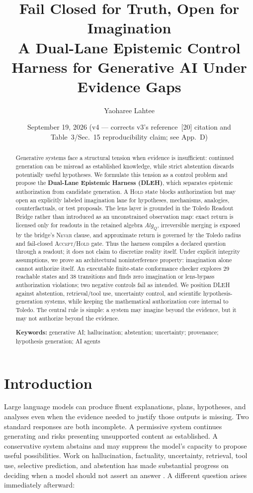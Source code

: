 \documentclass[10pt,twocolumn]{article}
\title{\Large\bfseries Fail Closed for Truth, Open for Imagination\\[2pt]
\large A Dual-Lane Epistemic Control Harness for Generative AI Under Evidence Gaps}
\author{Yaoharee Lahtee}
\affil{Open Civil Science Initiative}
\date{September 19, 2026 \; (v4 --- corrects v3's reference~[20] citation and Table~3/Sec.~15 reproducibility claim; see App.~D)}
\begin{document}
\maketitle

\begin{abstract}
\noindent
Generative systems face a structural tension when evidence is insufficient: continued generation can be misread as established knowledge, while strict abstention discards potentially useful hypotheses. We formulate this tension as a control problem and propose the \textbf{Dual-Lane Epistemic Harness (DLEH)}, which separates epistemic authorization from candidate generation. A \textsc{Hold} state blocks authorization but may open an explicitly labeled imagination lane for hypotheses, mechanisms, analogies, counterfactuals, or test proposals. The lens layer is grounded in the Toledo Readout Bridge rather than introduced as an unconstrained observation map: exact return is licensed only for readouts in the retained algebra $Alg_Q$, irreversible merging is exposed by the bridge's \textsc{Never} clause, and approximate return is governed by the Toledo radius and fail-closed \textsc{Accept}/\textsc{Hold} gate. Thus the harness compiles a declared question through a readout; it does not claim to discretize reality itself. Under explicit integrity assumptions, we prove an architectural noninterference property: imagination alone cannot authorize itself. An executable finite-state conformance checker explores 29 reachable states and 38 transitions and finds zero imagination or lens-bypass authorization violations; two negative controls fail as intended. We position DLEH against abstention, retrieval/tool use, uncertainty control, and scientific hypothesis-generation systems, while keeping the mathematical authorization core internal to Toledo. The central rule is simple: a system may imagine beyond the evidence, but it may not authorize beyond the evidence.

\smallskip
\noindent\textbf{Keywords:} generative AI; hallucination; abstention; uncertainty; provenance; hypothesis generation; AI agents
\end{abstract}

\section{Introduction}
Large language models can produce fluent explanations, plans, hypotheses, and analyses even when the evidence needed to justify those outputs is missing. Two standard responses are both incomplete. A permissive system continues generating and risks presenting unsupported content as established. A conservative system abstains and may suppress the model's capacity to propose useful possibilities. Work on hallucination, factuality, uncertainty, retrieval, tool use, selective prediction, and abstention has made substantial progress on deciding when a model should not assert an answer \cite{ji2023survey,manakul2023selfcheckgpt,farquhar2024detecting,min2023factscore,geifman2017selective,madhusudhan2025llms,kirichenko2025abstentionbench}. A different question arises immediately afterward:
\end{document}
